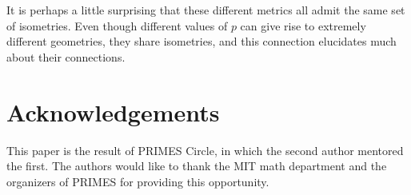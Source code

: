\documentclass{mystyle}
\begin{document}
It is perhaps a little surprising that these different metrics all admit the same set of isometries. Even though different values of $p$ can give rise to extremely different geometries, they share isometries, and this connection elucidates much about their connections.

\section*{Acknowledgements}
This paper is the result of PRIMES Circle, in which the second author mentored the first. The authors would like to thank the MIT math department and the organizers of PRIMES for providing this opportunity. 

\printbibliography
\end{document}

